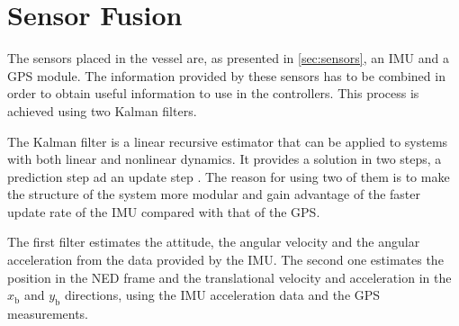 \chapter{Sensor Fusion}\label{chap:sensorFusion}
The sensors placed in the vessel are, as presented in \autoref{sec:sensors}, an IMU and a GPS module. The information provided by these sensors has to be combined in order to obtain useful information to use in the controllers. This process is achieved using two Kalman filters. 

The Kalman filter is a linear recursive estimator that can be applied to systems with both linear and nonlinear dynamics. It provides a solution in two steps, a prediction step ad an update step \cite{SHaykin}. The reason for using two of them is to make the structure of the system more modular and gain advantage of the faster update rate of the IMU compared with that of the GPS.

The first filter estimates the attitude, the angular velocity and the angular acceleration from the data provided by the IMU. The second one estimates the position in the NED frame and the translational velocity and acceleration in the $x_\mathrm{b}$ and $y_\mathrm{b}$ directions, using the IMU acceleration data and the GPS measurements.